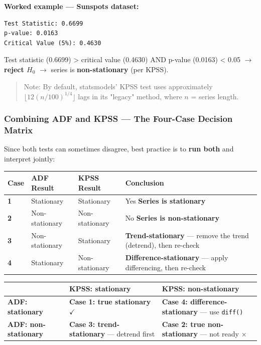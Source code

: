 \documentclass[12pt,openany]{book}
\begin{document}
\textbf{Worked example --- Sunspots dataset:}

\begin{Verbatim}[breaklines=true,breakanywhere=true,fontsize=\small]
Test Statistic: 0.6699
p-value: 0.0163
Critical Value (5%): 0.4630
\end{Verbatim}

Test statistic (0.6699) > critical value (0.4630) AND p-value (0.0163) < 0.05 \(\rightarrow\) \textbf{reject \(H_0\)} \(\rightarrow\) series is \textbf{non-stationary} (per KPSS).

\begin{quote}
Note: By default, statsmodels' KPSS test uses approximately \(\lfloor 12(n/100)^{1/4}\rfloor\) lags in its "legacy" method, where \(n\) = series length.\par

\end{quote}

\subsubsection{Combining ADF and KPSS --- The Four-Case Decision Matrix}

Since both tests can sometimes disagree, best practice is to \textbf{run both} and interpret jointly:

\begin{center}
\small
\begin{tabular}{|L{0.16\textwidth}|L{0.22\textwidth}|L{0.22\textwidth}|L{0.28\textwidth}|}
\hline
Case & ADF Result & KPSS Result & Conclusion \\
\hline
\textbf{1} & Stationary & Stationary & Yes \textbf{Series is stationary} \\
\hline
\textbf{2} & Non-stationary & Non-stationary & No \textbf{Series is non-stationary} \\
\hline
\textbf{3} & Non-stationary & Stationary & \textbf{Trend-stationary} --- remove the trend (detrend), then re-check \\
\hline
\textbf{4} & Stationary & Non-stationary & \textbf{Difference-stationary} --- apply differencing, then re-check \\
\hline
\end{tabular}
\normalsize
\end{center}


\begin{center}
\scriptsize
\setlength{\tabcolsep}{5pt}
\renewcommand{\arraystretch}{1.25}
\begin{tabular}{|L{2.6cm}|L{5.0cm}|L{5.0cm}|}
\hline
 & \textbf{KPSS: stationary} & \textbf{KPSS: non-stationary} \\
\hline
\textbf{ADF: stationary} & \textbf{Case 1: true stationary} \(\checkmark\) & \textbf{Case 4: difference-stationary} --- use \texttt{diff()} \\
\hline
\textbf{ADF: non-stationary} & \textbf{Case 3: trend-stationary} --- detrend first & \textbf{Case 2: true non-stationary} --- not ready \(\times\) \\
\hline
\end{tabular}
\end{center}
\end{document}
